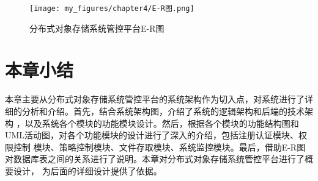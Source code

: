 \begin{figure}[htb]
    \centering
    \texttt{[image: my\_figures/chapter4/E-R图.png]}
    \caption{分布式对象存储系统管控平台E-R图}
    \label{fig:E-R图}
\end{figure}

\section{本章小结}

本章主要从分布式对象存储系统管控平台的系统架构作为切入点，对系统进行了详细的分析和介绍。首先，结合系统架构图，介绍了系统的逻辑架构和后端的技术架构
，以及系统各个模块的功能模块设计。然后，根据各个模块的功能结构图和UML活动图，对各个功能模块的设计进行了深入的介绍，包括注册认证模块、权限控制
模块、策略控制模块、文件存取模块、系统监控模块。最后，借助E-R图对数据库表之间的关系进行了说明。本章对分布式对象存储系统管控平台进行了概要设计，
为后面的详细设计提供了依据。